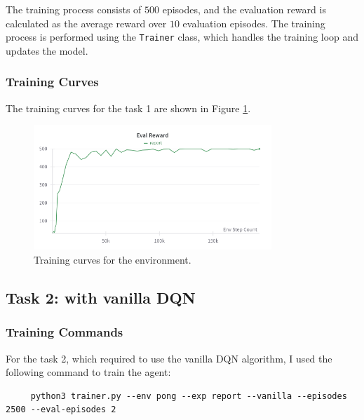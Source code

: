 The training process consists of $500$ episodes, and the evaluation reward is calculated as the average reward over $10$ evaluation episodes.
The training process is performed using the \texttt{Trainer} class, which handles the training loop and updates the model.

\subsubsection{Training Curves}

The training curves for the task 1 are shown in Figure \ref{fig:cartpole-training-curve}.

\begin{figure}[H]
    \centering
    \includegraphics[width=0.8\textwidth]{figures/task1.png}
    \caption{Training curves for the \cartpole environment.}
    \label{fig:cartpole-training-curve}
\end{figure}

\subsection{Task 2: \pong with vanilla DQN}

\subsubsection{Training Commands}

For the task 2, which required to use the vanilla DQN algorithm, I used the following command to train the agent:

\begin{verbatim}
     python3 trainer.py --env pong --exp report --vanilla --episodes 2500 --eval-episodes 2
\end{verbatim}

